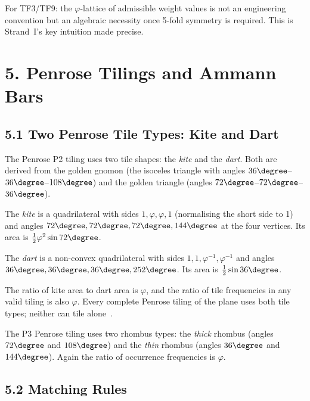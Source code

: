 For TF3/TF9: the \(\varphi\)-lattice of admissible
weight values is not an engineering convention but
an algebraic necessity once 5-fold symmetry is
required. This is Strand~I's key intuition made
precise.

\section{5. Penrose Tilings and Ammann
Bars}\label{sec:penrose-tilings}

\subsection{5.1 Two Penrose Tile Types: Kite and
Dart}\label{sec:kite-dart}

The Penrose P2 tiling uses two tile shapes: the
\emph{kite} and the \emph{dart}. Both are derived
from the golden gnomon (the isoceles triangle with
angles \(36\degree\)--\(36\degree\)--\(108\degree\))
and the golden triangle (angles
\(72\degree\)--\(72\degree\)--\(36\degree\)).

\begin{definition}[Kite]
The \emph{kite} is a quadrilateral with sides
\(1, \varphi, \varphi, 1\) (normalising the short
side to 1) and angles
\(72\degree, 72\degree, 72\degree, 144\degree\)
at the four vertices. Its area is
\(\frac{1}{2}\varphi^2 \sin 72\degree\).
\end{definition}

\begin{definition}[Dart]
The \emph{dart} is a non-convex quadrilateral
with sides \(1, 1, \varphi^{-1}, \varphi^{-1}\)
and angles \(36\degree, 36\degree, 36\degree,
252\degree\). Its area is
\(\frac{1}{2}\sin 36\degree\).
\end{definition}

The ratio of kite area to dart area is
\(\varphi\), and the ratio of tile
frequencies in any valid tiling is also
\(\varphi\). Every complete Penrose tiling of the
plane uses both tile types; neither can tile
alone~\cite{senechal_quasicrystals}.

The P3 Penrose tiling uses two rhombus types: the
\emph{thick} rhombus (angles \(72\degree\) and
\(108\degree\)) and the \emph{thin} rhombus (angles
\(36\degree\) and \(144\degree\)). Again the ratio
of occurrence frequencies is \(\varphi\).

\subsection{5.2 Matching Rules}\label{sec:matching-rules}

